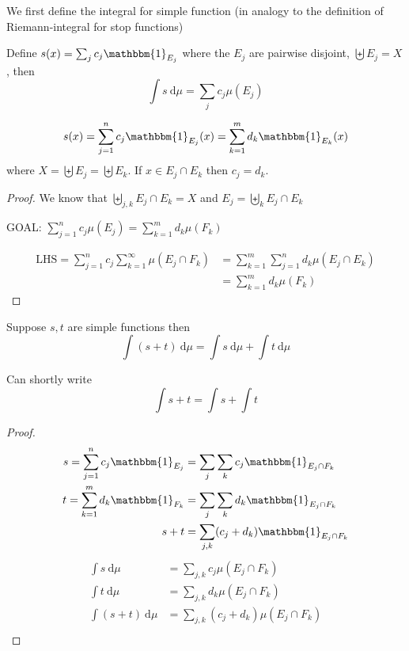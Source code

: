 We first define the integral for simple function (in analogy to the definition of Riemann-integral for stop functions)
\begin{definition}
  Define 
  $s(x) = \sum_j c_j \mathbbm{1}_{E_j}$
  where the $E_j$ are pairwise disjoint, $\biguplus E_j = X$, then
  \[\int s \ \mathrm{d}\mu = \sum_j c_j \mu(E_j)\]
\end{definition}

\begin{claim}
  $$s(x) = \sum_{j=1}^n c_j\mathbbm{1}_{E_j}(x) = \sum_{k = 1}^m d_k \mathbbm{1}_{E_k}(x)$$
  where $X = \biguplus E_j = \biguplus E_k$. If $x \in E_j \cap E_k$ then $c_j = d_k$.
\end{claim}

\begin{proof}
  We know that $\biguplus_{j, k} E_j \cap E_k = X$ and $E_j = \biguplus_{k} E_j \cap E_k$

  GOAL: $\sum_{j=1}^n c_j\mu(E_j) = \sum_{k=1}^m d_k \mu(F_k)$

  \begin{align*}
    \text{LHS}=\sum_{j=1}^n c_j \sum_{k=1}^\infty \mu(E_j \cap F_k) &= \sum_{k=1}^m \sum_{j=1}^n d_k \mu(E_j \cap E_k) \\
    &= \sum_{k=1}^m d_k \mu(F_k)
  \end{align*}
\end{proof}


\begin{lemma}
  Suppose $s, t$ are simple functions then
  \[\int (s + t)\ \mathrm{d}\mu = \int s \ \mathrm{d}\mu+ \int t\ \mathrm{d}\mu\] 
\end{lemma}

\begin{remark}
  Can shortly write 
  \[\int s + t = \int s + \int t\]
\end{remark}

\begin{proof}
  \begin{align*}
  s = \sum_{j=1}^n c_j \mathbbm{1}_{E_j} &= \sum_{j}\sum_k c_j \mathbbm{1}_{E_{j} \cap F_k} \\
  t = \sum_{k=1}^m d_k \mathbbm{1}_{F_k} &= \sum_{j}\sum_k d_k \mathbbm{1}_{E_{j} \cap F_k} \\
  s + t&= \sum_{j, k} (c_j + d_k) \mathbbm{1}_{E_j \cap F_k} \\
  \end{align*} 
  \begin{align*}
    \int s\ \mathrm{d}\mu &= \sum_{j, k}c_j \mu(E_j \cap F_k) \\
    \int t\ \mathrm{d}\mu &= \sum_{j, k}d_k \mu(E_j \cap F_k) \\
    \int (s + t)\ \mathrm{d}\mu &= \sum_{j, k}(c_j + d_k) \mu(E_j \cap F_k) \\
  \end{align*}
\end{proof}

